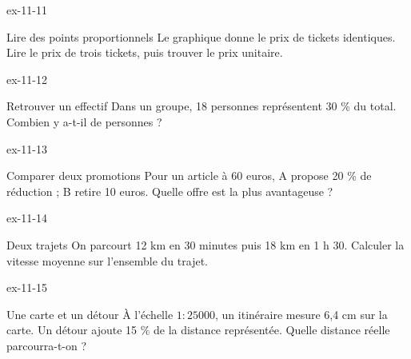 \begin{blocLivre}{ex-11-11}\begin{exercice}[3]{Lire des points proportionnels}
Le graphique donne le prix de tickets identiques. Lire le prix de trois tickets, puis trouver le prix unitaire.
\label{fig-ex-11-11}
\end{exercice}\end{blocLivre}
\begin{blocLivre}{ex-11-12}\begin{exercice}[3]{Retrouver un effectif}
Dans un groupe, 18 personnes représentent 30 \% du total. Combien y a-t-il de personnes ?
\end{exercice}\end{blocLivre}
\begin{blocLivre}{ex-11-13}\begin{exercice}[3]{Comparer deux promotions}
Pour un article à 60 euros, A propose 20 \% de réduction ; B retire 10 euros. Quelle offre est la plus avantageuse ?
\end{exercice}\end{blocLivre}
\begin{blocLivre}{ex-11-14}\begin{exercice}[3]{Deux trajets}
On parcourt 12 km en 30 minutes puis 18 km en 1 h 30. Calculer la vitesse moyenne sur l’ensemble du trajet.
\end{exercice}\end{blocLivre}
\begin{blocLivre}{ex-11-15}\begin{exercice}[3]{Une carte et un détour}
À l’échelle $1:25000$, un itinéraire mesure 6,4 cm sur la carte. Un détour ajoute 15 \% de la distance représentée. Quelle distance réelle parcourra-t-on ?
\label{fig-ex-11-15}
\end{exercice}\end{blocLivre}

\clearpage
